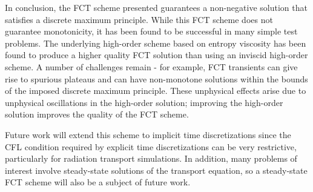 In conclusion, the FCT scheme presented guarantees
a non-negative solution that satisfies a discrete maximum principle.
While this FCT scheme does not guarantee monotonicity, it has been
found to be successful in many simple test problems. The underlying
high-order scheme based on entropy viscosity has been found to
produce a higher quality FCT solution than using an inviscid
high-order scheme. A number of challenges remain - for example,
FCT transients can give rise to spurious plateaus and can have non-monotone
solutions within the bounds of the imposed discrete maximum principle.
These unphysical effects arise due to unphysical oscillations in the
high-order solution; improving the high-order solution improves
the quality of the FCT scheme.

Future work will extend this scheme to implicit time
discretizations since the CFL condition required by explicit time
discretizations can be very restrictive, particularly for radiation transport simulations.
In addition, many problems of interest involve steady-state solutions
of the transport equation, so a steady-state FCT scheme will also be
a subject of future work.

